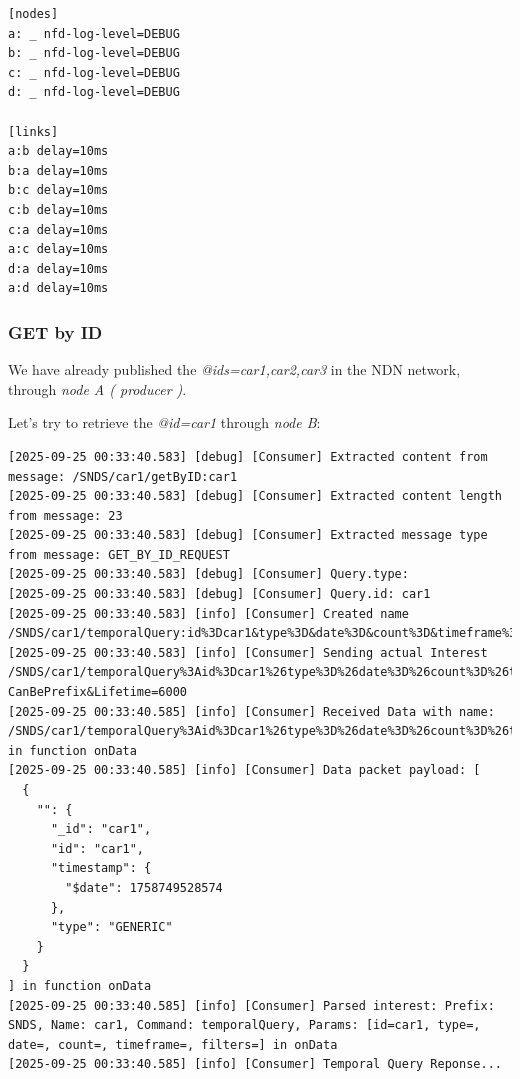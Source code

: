 \documentclass{article}
\begin{document}
\begin{lstlisting}[language=minindnconf,caption={Mini-NDN topology .conf file},label={lst:minindn_conf}]
[nodes]
a: _ nfd-log-level=DEBUG
b: _ nfd-log-level=DEBUG
c: _ nfd-log-level=DEBUG
d: _ nfd-log-level=DEBUG

[links]
a:b delay=10ms
b:a delay=10ms
b:c delay=10ms
c:b delay=10ms
c:a delay=10ms
a:c delay=10ms
d:a delay=10ms
a:d delay=10ms
\end{lstlisting}


\pagebreak 

\subsubsection{GET by ID}

We have already published the \textit{@ids=car1,car2,car3} in the NDN network, through \emph{node A ( producer )}.


Let's try to retrieve the \textit{@id=car1} through \emph{node B}:

\begin{lstlisting}[language=log, caption={Node's B log after performing a GET by ID for car1}, label={lst:node-b-log-file-car1}]
[2025-09-25 00:33:40.583] [debug] [Consumer] Extracted content from message: /SNDS/car1/getByID:car1
[2025-09-25 00:33:40.583] [debug] [Consumer] Extracted content length from message: 23
[2025-09-25 00:33:40.583] [debug] [Consumer] Extracted message type from message: GET_BY_ID_REQUEST
[2025-09-25 00:33:40.583] [debug] [Consumer] Query.type: 
[2025-09-25 00:33:40.583] [debug] [Consumer] Query.id: car1
[2025-09-25 00:33:40.583] [info] [Consumer] Created name /SNDS/car1/temporalQuery:id%3Dcar1&type%3D&date%3D&count%3D&timeframe%3D&filters%3D
[2025-09-25 00:33:40.583] [info] [Consumer] Sending actual Interest /SNDS/car1/temporalQuery%3Aid%3Dcar1%26type%3D%26date%3D%26count%3D%26timeframe%3D%26filters%3D?CanBePrefix&Lifetime=6000
[2025-09-25 00:33:40.585] [info] [Consumer] Received Data with name: /SNDS/car1/temporalQuery%3Aid%3Dcar1%26type%3D%26date%3D%26count%3D%26timeframe%3D%26filters%3D in function onData
[2025-09-25 00:33:40.585] [info] [Consumer] Data packet payload: [
  {
    "": {
      "_id": "car1",
      "id": "car1",
      "timestamp": {
        "$date": 1758749528574
      },
      "type": "GENERIC"
    }
  }
] in function onData
[2025-09-25 00:33:40.585] [info] [Consumer] Parsed interest: Prefix: SNDS, Name: car1, Command: temporalQuery, Params: [id=car1, type=, date=, count=, timeframe=, filters=] in onData
[2025-09-25 00:33:40.585] [info] [Consumer] Temporal Query Reponse... 
\end{lstlisting}
\end{document}
